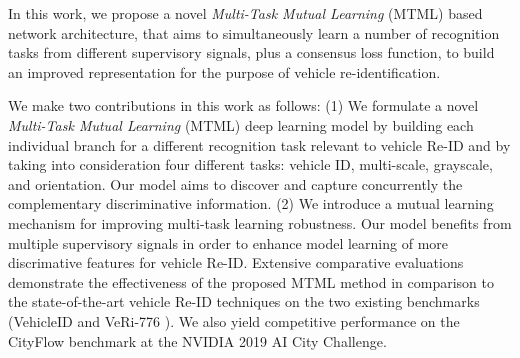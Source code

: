 \documentclass[10pt,twocolumn,letterpaper]{article}
\begin{document}

In this work, we propose a novel {\em Multi-Task Mutual Learning}
(MTML) based network architecture,
that aims to simultaneously learn a number of recognition tasks from
different supervisory signals, plus a consensus loss function, to
build an improved representation for the purpose of vehicle
re-identification.

We make two contributions in this work as follows:
(1) We formulate a novel {\em Multi-Task Mutual Learning} (MTML) deep
learning model by building each individual branch for a different
recognition task relevant to vehicle Re-ID and by taking into
consideration four different tasks: vehicle ID, multi-scale, grayscale, and orientation.
Our model aims to discover and capture concurrently the complementary discriminative information.
(2) We introduce a mutual learning mechanism for improving multi-task learning robustness.
Our model benefits from multiple supervisory signals in order to
enhance model learning of more discrimative features for vehicle Re-ID.
Extensive comparative evaluations demonstrate the effectiveness of the
proposed MTML method in comparison to the state-of-the-art vehicle Re-ID techniques on the two existing benchmarks
(VehicleID \cite{liu2016vehicleid} and VeRi-776 \cite{liu2016veri}).
We also yield competitive performance on the CityFlow
\cite{tang2019cityflow} benchmark at the NVIDIA 2019 AI City Challenge.


\end{document}
